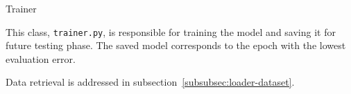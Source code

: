 \begin{section}{Trainer}
    \label{sec:trainer}
    \par This class, \texttt{trainer.py}, is responsible for training the model and saving it for future testing phase. The saved model corresponds to the epoch with the lowest evaluation error.
    \par Data retrieval is addressed in subsection~\ref{subsubsec:loader-dataset}.
    
\end{section}
\clearpage